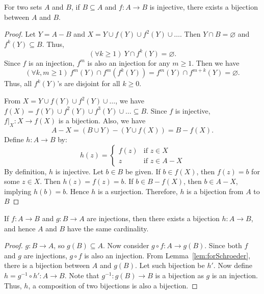 \documentclass[../main.tex]{subfiles}
\begin{document}
\begin{lem} \label{lem:forSchroeder}
    For two sets $A$ and $B$, if $B \subseteq A$ and $f: A \rightarrow B$ is injective, there exists a bijection between $A$ and $B$.
\end{lem}
\begin{proof}
    Let $Y = A - B$ and $X = Y \cup f(Y) \cup f^2(Y) \cup \dots$.
    Then $Y \cap B = \varnothing$ and $f^k (Y) \subseteq B$.
    Thus, 
    \[
        (\forall k \geq 1)\ Y \cap f^k (Y) = \varnothing.
    \]
    Since $f$ is an injection, $f^m$ is also an injection for any $m \geq 1$.
    Then we have
    \[
        (\forall k, m \geq 1)\ f^m(Y) \cap f^m \left(f^k(Y)\right) = f^m(Y) \cap f^{m + k} (Y) = \varnothing.
    \]
    Thus, all $f^k(Y)$'s are disjoint for all $k \geq 0$.

    From $X = Y \cup f(Y) \cup f^2(Y) \cup \dots$, we have $f(X) = f(Y) \cup f^2(Y) \cup f^3(Y) \cup \dots \subseteq B$.
    Since $f$ is injective, $f|_X: X \rightarrow f(X)$ is a bijection.
    Also, we have
    \[
        A - X = (B \cup Y) - (Y \cup f(X)) = B - f(X).
    \]
    Define $h: A \rightarrow B$ by:
    \[
        h(z) = \begin{cases}
            f(z) &\text{if } z \in X\\
            z &\text{if } z \in A - X
        \end{cases}
    \]
    By definition, $h$ is injective.
    Let $b \in B$ be given.
    If $b \in f(X)$, then $f(z) = b$ for some $z \in X$.
    Then $h(z) = f(z) = b$.
    If $b \in B - f(X)$, then $b \in A - X$, implying $h(b) = b$.
    Hence $h$ is a surjection.
    Therefore, $h$ is a bijection from $A$ to $B$
\end{proof}

\begin{thm}  \label{thm:shroder}
    If $f: A \rightarrow B$ and $g: B \rightarrow A$ are injections, then there exists a bijection $h: A \rightarrow B$, and hence $A$ and $B$ have the same cardinality.
\end{thm}
\begin{proof}
    $g: B \rightarrow A$, so $g(B) \subseteq A$.
    Now consider $g \circ f: A \rightarrow g(B)$.
    Since both $f$ and $g$ are injections, $g \circ f$ is also an injection.
    From Lemma~\ref{lem:forSchroeder}, there is a bijection between $A$ and $g(B)$.
    Let such bijection be $h'$.
    Now define $h = g^{-1} \circ h': A \rightarrow B$.
    Note that $g^{-1}: g(B) \rightarrow B$ is a bijection as $g$ is an injection.
    Thus, $h$, a composition of two bijections is also a bijection.
\end{proof}
\end{document}
